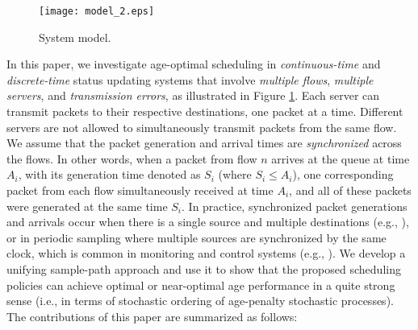 \begin{figure}
\centering 
\texttt{[image: model\_2.eps]} 
\vspace{-0mm}
\caption{System model.}
\label{fig_model} 
\vspace{-5mm}
\end{figure} 

In this paper, we investigate age-optimal scheduling in \emph{continuous-time} and \emph{discrete-time} status updating systems that involve \emph{multiple flows}, \emph{multiple servers}, and \emph{transmission errors}, as illustrated in Figure \ref{fig_model}. Each server can transmit packets to their respective destinations, one packet at a time. Different servers are not allowed to simultaneously transmit packets from the same flow. {We assume that the packet generation and arrival times are \emph{synchronized} across the flows. 
In other words, when a packet from flow $n$ arrives at the queue at time $A_i$, with its generation time denoted as $S_i$ (where $S_i\leq A_i$), one corresponding packet from each flow simultaneously received at time $A_i$, and all of these packets were generated at the same time $S_i$.
In practice, synchronized packet generations and arrivals occur when there is a single source and multiple destinations (e.g.,  \cite{IgorAllerton2016}), or in periodic sampling where multiple sources are synchronized by the same clock, which is common in  monitoring and control systems \ifreport
(e.g.,  \cite{Phadke1994,Sivrikaya2004})\fi.}
We develop a unifying sample-path approach and use it to show that the proposed scheduling policies can achieve optimal or near-optimal age performance in a quite strong sense (i.e., in terms of stochastic ordering of age-penalty stochastic processes). 
The contributions of this paper are summarized as follows:
